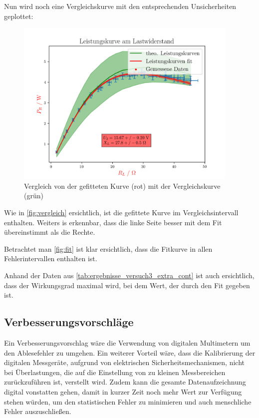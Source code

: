 \documentclass[11pt,ngerman]{scrartcl}
\begin{document}
Nun wird noch eine Vergleichskurve mit den entsprechenden Unsicherheiten geplottet:
\begin{figure}[H]
	\begin{center}
		\includegraphics[width=0.95\textwidth]{./bigpics/vergleich}
	\end{center}
	\caption{Vergleich von der gefitteten Kurve (rot) mit der Vergleichskurve (grün)}
	\label{fig:vergleich}
\end{figure}

Wie in \autoref{fig:vergleich} ersichtlich, ist die gefittete Kurve im
Vergleichsintervall enthalten. Weiters is erkennbar, dass die linke Seite
besser mit dem Fit übereinstimmt als die Rechte.

\vspace{2mm}

Betrachtet man \autoref{fig:fit} ist klar ersichtlich, dass die Fitkurve in
allen Fehlerintervallen enthalten ist.

Anhand der Daten aus \autoref{tab:ergebnisse_versuch3_extra_cont} ist auch
ersichtlich, dass der Wirkungsgrad maximal wird, bei dem Wert, der durch den Fit
gegeben ist.


\subsection{Verbesserungsvorschläge}
Ein Verbesserungsvorschlag wäre die Verwendung von digitalen Multimetern um den
Ablesefehler zu umgehen.
Ein weiterer Vorteil wäre, dass die Kalibrierung der digitalen Messgeräte,
aufgrund von elektrischen Sicherheitsmechanismen, nicht bei Überlastungen, die
auf die Einstellung von zu kleinen Messbereichen zurückzuführen ist, verstellt wird.
Zudem kann die gesamte Datenaufzeichnung digital vonstatten gehen, damit in kurzer Zeit noch mehr
Wert zur Verfügung stehen würden, um den statistischen Fehler zu minimieren und auch menschliche Fehler auszuschließen.
\end{document}
